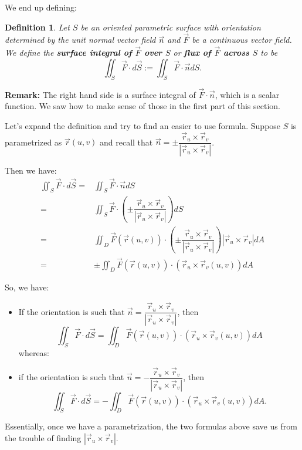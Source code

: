 \documentclass[12pt]{article}
\newcommand{\vr}{\vec{r}{}}
\newcommand{\vF}{\vec{F}}
\newcommand{\vn}{\vec{n}}
\newcommand{\vS}{\vec{S}}
\newcommand{\rcross}{\vr_u\times\vr_v}
\newtheorem{defn}{Definition}
\begin{document}
We end up defining:

\begin{defn}
Let $S$ be an oriented parametric surface with orientation determined by the unit normal vector field $\vn$ and $\vF$ be a continuous vector field. We define the \textbf{surface integral of $\vF$ over $S$} or \textbf{flux of $\vF$ across $S$} to be $$\iint_S\vF\cdot d \vS :=\iint_S \vF\cdot \vn dS.$$
\end{defn}

\textbf{Remark:} The right hand side is a surface integral of $\vF\cdot \vn$, which is a scalar function. We saw how to make sense of those in the first part of this section.
\vspace{.2 in}

Let's expand the definition and try to find an easier to use formula. Suppose $S$ is parametrized as $\vr(u,v) $ and recall that $\vn=\pm\dfrac{\rcross}{|\rcross|}$.

Then we have:
\begin{align*}
\iint_S\vF\cdot d \vS =&\iint_S \vF\cdot \vn dS\\
=& \iint_S \vF\cdot \left (\pm\dfrac{\rcross}{|\rcross|}\right )dS\\
=& \iint_D \vF\left (\vr(u,v)\right )\cdot \left (\pm\dfrac{\rcross}{|\rcross|}\right )|\rcross|dA\\
=& \pm\iint_D \vF\left (\vr(u,v)\right )\cdot (\rcross(u,v)) dA
\end{align*}
 
So, we have:

\begin{itemize}
\item If the orientation is such that $\vn=\dfrac{\rcross}{|\rcross|}$, then \begin{equation}\iint_S\vF\cdot d \vS=\iint_D \vF\left (\vr(u,v)\right )\cdot (\rcross(u,v)) dA \end{equation} whereas:

\item  if the orientation is such that $\vn=-\dfrac{\rcross}{|\rcross|}$, then \begin{equation}
 \label{eq1}\iint_S\vF\cdot d \vS=-\iint_D \vF\left (\vr(u,v)\right )\cdot (\rcross(u,v))dA .
 \end{equation}
\end{itemize}
Essentially, once we have a parametrization, the two formulas above save us from the trouble of finding $|\rcross|$.

\vspace{.2 in}
\end{document}
